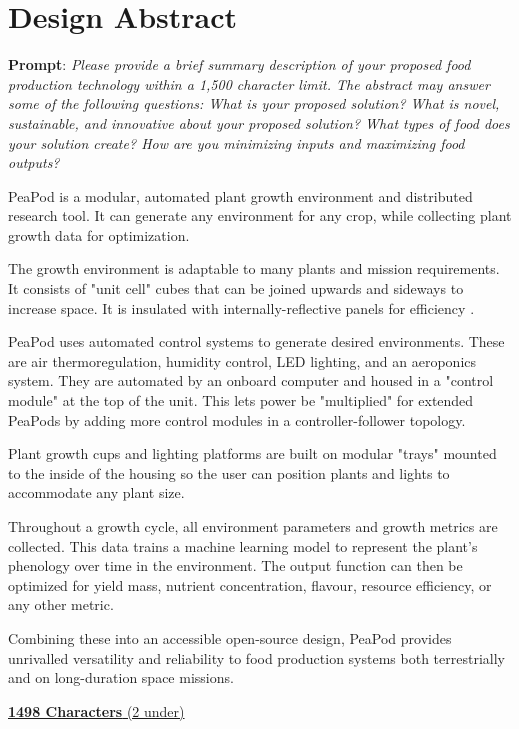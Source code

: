 \documentclass{report}
\begin{document}
\tableofcontents
\newpage

\section{Design Abstract}
\textbf{Prompt}: \textit{Please provide a brief summary description of your proposed food production technology within a 1,500 character limit. The abstract may answer some of the following questions: What is your proposed solution? What is novel, sustainable, and innovative about your proposed solution? What types of food does your solution create? How are you minimizing inputs and maximizing food outputs?}

PeaPod is a modular, automated plant growth environment and distributed research tool. It can generate any environment for any crop, while collecting plant growth data for optimization.

The growth environment is adaptable to many plants and mission requirements. It consists of "unit cell" cubes that can be joined upwards and sideways to increase space. It is insulated with internally-reflective panels for efficiency \cite{insulation}.

PeaPod uses automated control systems to generate desired environments. These are air thermoregulation, humidity control, LED lighting, and an aeroponics system. They are automated by an onboard computer and housed in a "control module" at the top of the unit. This lets power be "multiplied" for extended PeaPods by adding more control modules in a controller-follower topology.

Plant growth cups and lighting platforms are built on modular "trays" mounted to the inside of the housing so the user can position plants and lights to accommodate any plant size.

Throughout a growth cycle, all environment parameters and growth metrics are collected. This data trains a machine learning model to represent the plant's phenology over time in the environment. The output function can then be optimized for yield mass, nutrient concentration, flavour, resource efficiency, or any other metric.

Combining these into an accessible open-source design, PeaPod provides unrivalled versatility and reliability to food production systems both terrestrially and on long-duration space missions.

\uline{\textbf{1498 Characters} (2 under)}

\newpage
\end{document}
